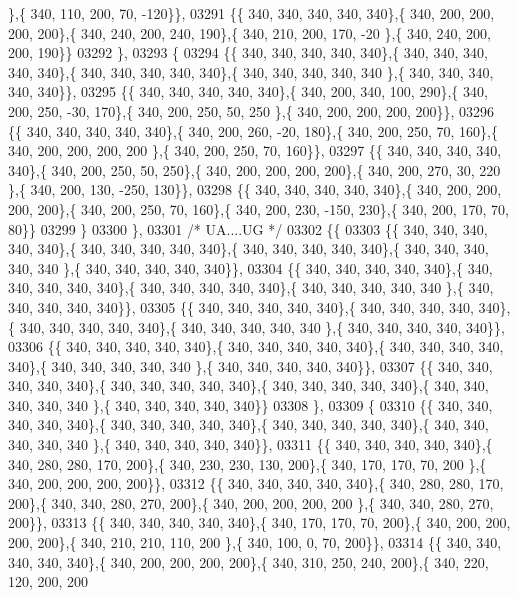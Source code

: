 \begin{DoxyCode}
      \},\{ 340, 110, 200,  70, -120\}\},
03291 \{\{ 340, 340, 340, 340, 340\},\{ 340, 200, 200, 200, 200\},\{ 340, 240, 200, 240, 190\},\{ 340, 210, 200, 170, -20
      \},\{ 340, 240, 200, 200, 190\}\}
03292 \},
03293 \{
03294 \{\{ 340, 340, 340, 340, 340\},\{ 340, 340, 340, 340, 340\},\{ 340, 340, 340, 340, 340\},\{ 340, 340, 340, 340, 340
      \},\{ 340, 340, 340, 340, 340\}\},
03295 \{\{ 340, 340, 340, 340, 340\},\{ 340, 200, 340, 100, 290\},\{ 340, 200, 250, -30, 170\},\{ 340, 200, 250,  50, 250
      \},\{ 340, 200, 200, 200, 200\}\},
03296 \{\{ 340, 340, 340, 340, 340\},\{ 340, 200, 260, -20, 180\},\{ 340, 200, 250,  70, 160\},\{ 340, 200, 200, 200, 200
      \},\{ 340, 200, 250,  70, 160\}\},
03297 \{\{ 340, 340, 340, 340, 340\},\{ 340, 200, 250,  50, 250\},\{ 340, 200, 200, 200, 200\},\{ 340, 200, 270,  30, 220
      \},\{ 340, 200, 130, -250, 130\}\},
03298 \{\{ 340, 340, 340, 340, 340\},\{ 340, 200, 200, 200, 200\},\{ 340, 200, 250,  70, 160\},\{ 340, 200, 230, -150, 
      230\},\{ 340, 200, 170,  70,  80\}\}
03299 \}
03300 \},
03301 \textcolor{comment}{/* UA....UG */}
03302 \{\{
03303 \{\{ 340, 340, 340, 340, 340\},\{ 340, 340, 340, 340, 340\},\{ 340, 340, 340, 340, 340\},\{ 340, 340, 340, 340, 340
      \},\{ 340, 340, 340, 340, 340\}\},
03304 \{\{ 340, 340, 340, 340, 340\},\{ 340, 340, 340, 340, 340\},\{ 340, 340, 340, 340, 340\},\{ 340, 340, 340, 340, 340
      \},\{ 340, 340, 340, 340, 340\}\},
03305 \{\{ 340, 340, 340, 340, 340\},\{ 340, 340, 340, 340, 340\},\{ 340, 340, 340, 340, 340\},\{ 340, 340, 340, 340, 340
      \},\{ 340, 340, 340, 340, 340\}\},
03306 \{\{ 340, 340, 340, 340, 340\},\{ 340, 340, 340, 340, 340\},\{ 340, 340, 340, 340, 340\},\{ 340, 340, 340, 340, 340
      \},\{ 340, 340, 340, 340, 340\}\},
03307 \{\{ 340, 340, 340, 340, 340\},\{ 340, 340, 340, 340, 340\},\{ 340, 340, 340, 340, 340\},\{ 340, 340, 340, 340, 340
      \},\{ 340, 340, 340, 340, 340\}\}
03308 \},
03309 \{
03310 \{\{ 340, 340, 340, 340, 340\},\{ 340, 340, 340, 340, 340\},\{ 340, 340, 340, 340, 340\},\{ 340, 340, 340, 340, 340
      \},\{ 340, 340, 340, 340, 340\}\},
03311 \{\{ 340, 340, 340, 340, 340\},\{ 340, 280, 280, 170, 200\},\{ 340, 230, 230, 130, 200\},\{ 340, 170, 170,  70, 200
      \},\{ 340, 200, 200, 200, 200\}\},
03312 \{\{ 340, 340, 340, 340, 340\},\{ 340, 280, 280, 170, 200\},\{ 340, 340, 280, 270, 200\},\{ 340, 200, 200, 200, 200
      \},\{ 340, 340, 280, 270, 200\}\},
03313 \{\{ 340, 340, 340, 340, 340\},\{ 340, 170, 170,  70, 200\},\{ 340, 200, 200, 200, 200\},\{ 340, 210, 210, 110, 200
      \},\{ 340, 100,   0,  70, 200\}\},
03314 \{\{ 340, 340, 340, 340, 340\},\{ 340, 200, 200, 200, 200\},\{ 340, 310, 250, 240, 200\},\{ 340, 220, 120, 200, 200

\end{DoxyCode}
